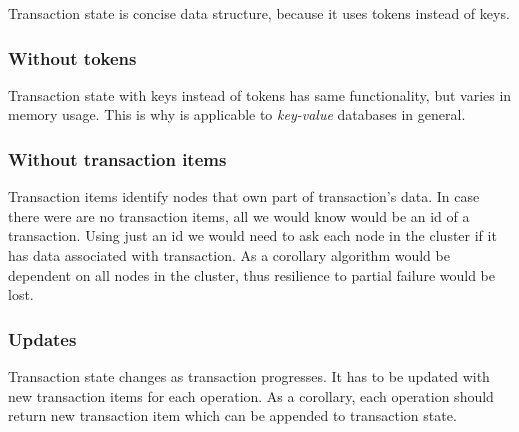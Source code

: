  

Transaction state is concise data structure, because it uses tokens instead of keys. 

\subsubsection{Without tokens}
Transaction state with keys instead of tokens has same functionality, but varies in memory usage. This is why \mpp is applicable to \emph{key-value} databases in general.

\subsubsection{Without transaction items}
Transaction items identify nodes that own part of transaction's data. 
In case there were are no transaction items, all we would know would be an id of a transaction.
Using just an id we would need to ask each node in the cluster if it has data associated with transaction. As a corollary algorithm would be dependent on all nodes in the cluster, thus resilience to partial failure would be lost.

\subsubsection{Updates}
Transaction state changes as transaction progresses. It has to be updated with new transaction items for each operation. As a corollary, each operation should return new transaction item which can be appended to transaction state. 



